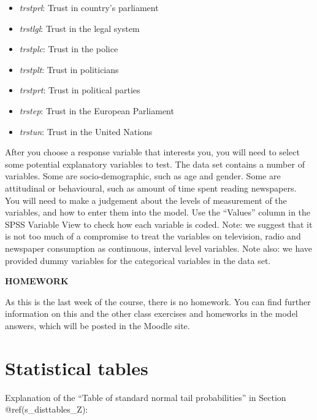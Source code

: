 \documentclass[11pt,a4paper,openany]{book}
\begin{document}
\begin{itemize}
\item
  \emph{trstprl}: Trust in country's parliament
\item
  \emph{trstlgl}: Trust in the legal system
\item
  \emph{trstplc}: Trust in the police
\item
  \emph{trstplt}: Trust in politicians
\item
  \emph{trstprt}: Trust in political parties
\item
  \emph{trstep}: Trust in the European Parliament
\item
  \emph{trstun}: Trust in the United Nations
\end{itemize}

After you choose a response variable that interests you, you will need
to select some potential explanatory variables to test. The data set
contains a number of variables. Some are socio-demographic, such as age
and gender. Some are attitudinal or behavioural, such as amount of time
spent reading newspapers. You will need to make a judgement about the
levels of measurement of the variables, and how to enter them into the
model. Use the ``Values'' column in the SPSS Variable View to check how
each variable is coded. Note: we suggest that it is not too much of a
compromise to treat the variables on television, radio and newspaper
consumption as continuous, interval level variables. Note also: we have
provided dummy variables for the categorical variables in the data set.

\textbf{HOMEWORK}

As this is the last week of the course, there is no homework. You can
find further information on this and the other class exercises and
homeworks in the model answers, which will be posted in the Moodle site.

\newpage

\section{Statistical tables}\label{c-disttables}

Explanation of the ``Table of standard normal tail probabilities'' in
Section @ref(s\_disttables\_Z):
\end{document}
